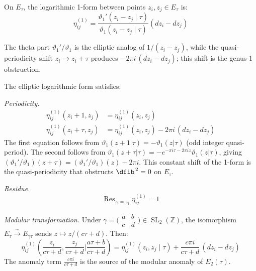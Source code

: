 \begin{definition}
\label{def:elliptic-log-form}
On $E_\tau$, the logarithmic 1-form between points $z_i, z_j \in E_\tau$ is:
\begin{equation}
\eta_{ij}^{(1)} = \frac{\vartheta_1'(z_i - z_j \mid \tau)}{\vartheta_1(z_i - z_j \mid \tau)}(dz_i - dz_j)
\end{equation}

The theta part $\vartheta_1'/\vartheta_1$ is the elliptic analog of $1/(z_i - z_j)$, while the quasi-periodicity shift $z_i \to z_i + \tau$ produces $-2\pi i\,(dz_i - dz_j)$; this shift is the genus-1 obstruction.
\end{definition}

\begin{theorem}
\label{thm:eta-properties-genus1}
The elliptic logarithmic form satisfies:

\emph{Periodicity.}
\begin{align}
\eta_{ij}^{(1)}(z_i + 1, z_j) &= \eta_{ij}^{(1)}(z_i, z_j) \\
\eta_{ij}^{(1)}(z_i + \tau, z_j) &= \eta_{ij}^{(1)}(z_i, z_j) - 2\pi i\,(dz_i - dz_j)
\end{align}
The first equation follows from $\vartheta_1(z+1|\tau) = -\vartheta_1(z|\tau)$ (odd integer quasi-period). The second follows from $\vartheta_1(z+\tau|\tau) = -e^{-\pi i\tau - 2\pi i z}\vartheta_1(z|\tau)$, giving $(\vartheta_1'/\vartheta_1)(z+\tau) = (\vartheta_1'/\vartheta_1)(z) - 2\pi i$. This constant shift of the 1-form is the quasi-periodicity that obstructs $\dfib^{\,2} = 0$ on $E_\tau$.

\emph{Residue.}
\begin{equation}
\operatorname{Res}_{z_i = z_j} \eta_{ij}^{(1)} = 1
\end{equation}

\emph{Modular transformation.} Under $\gamma = \bigl(\begin{smallmatrix}a&b\\c&d\end{smallmatrix}\bigr) \in \operatorname{SL}_2(\mathbb{Z})$, the isomorphism $E_\tau \xrightarrow{\sim} E_{\gamma\tau}$ sends $z \mapsto z/(c\tau+d)$.  Then:
\begin{equation}
\eta_{ij}^{(1)}\!\left(\frac{z_i}{c\tau+d}, \frac{z_j}{c\tau+d} \bigg| \frac{a\tau+b}{c\tau+d}\right)
= \eta_{ij}^{(1)}(z_i, z_j \mid \tau) + \frac{c\pi i}{c\tau+d}\,(dz_i - dz_j)
\end{equation}
The anomaly term $\frac{c\pi i}{c\tau+d}$ is the source of the modular anomaly of $E_2(\tau)$.
\end{theorem}

